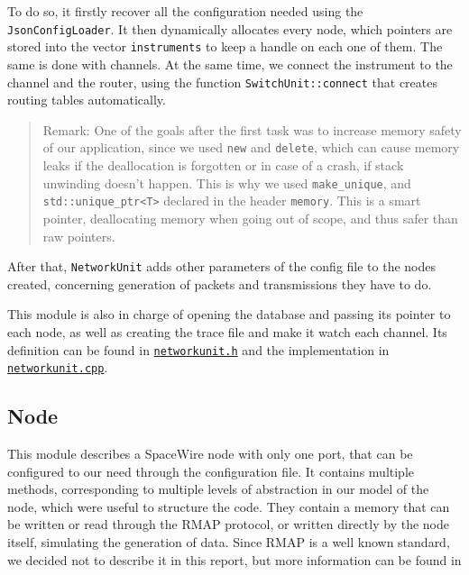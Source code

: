 \documentclass[12pt,a4paper]{article}
\begin{document}
To do so, it firstly recover all the configuration needed using the \texttt{JsonConfigLoader}. It then dynamically allocates every node, which pointers are stored into the vector \texttt{instruments} to keep a handle on each one of them. The same is done with channels. At the same time, we connect the instrument to the channel and the router, using the function \texttt{SwitchUnit::connect} that creates routing tables automatically. 
\begin{quote}
Remark: One of the goals after the first task was to increase memory safety of our application, since we used \texttt{new} and \texttt{delete}, which can cause memory leaks if the deallocation is forgotten or in case of a crash, if stack unwinding doesn't happen. This is why we used \texttt{make\_unique}, and \texttt{std::unique\_ptr<T>} declared in the header \texttt{memory}. This is a smart pointer, deallocating memory when going out of scope, and thus safer than raw pointers.
\end{quote}

After that, \texttt{NetworkUnit} adds other parameters of the config file to the nodes created, concerning generation of packets and transmissions they have to do.

This module is also in charge of opening the database and passing its pointer to each node, as well as creating the trace file and make it watch each channel. Its definition can be found in \href{https://github.com/suai-ipsa2018/ExoMars2020/blob/master/ExoMars2020/Network/networkunit.h}{\texttt{networkunit.h}} and the implementation in \href{https://github.com/suai-ipsa2018/ExoMars2020/blob/master/ExoMars2020/Network/networkunit.cpp}{\texttt{networkunit.cpp}}.

\subsection{Node}
\label{ssec:Node}
This module describes a SpaceWire node with only one port, that can be configured to our need through the configuration file. It contains multiple methods, corresponding to multiple levels of abstraction in our model of the node, which were useful to structure the code. They contain a memory that can be written or read through the RMAP protocol, or written directly by the node itself, simulating the generation of data. Since RMAP is a well known standard, we decided not to describe it in this report, but more information can be found in \cite{RMAP}\medbreak
\end{document}
